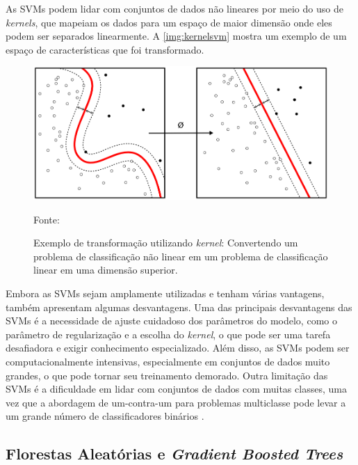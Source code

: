 As SVMs podem lidar com conjuntos de dados não lineares por meio do uso de \textit{kernels}, que mapeiam os dados para um espaço de maior dimensão onde eles podem ser separados linearmente. A \autoref{img:kernelsvm} mostra um exemplo de um espaço de características que foi transformado.

\begin{figure}[H]
	\centering
	\caption{\label{img:kernelsvm}Exemplo de transformação utilizando \textit{kernel}: Convertendo um problema de classificação não linear em um problema de classificação linear em uma dimensão superior.}
	\includegraphics[scale=0.5]{USPSC-img/Kernel_Machine.png}
	\begin{center}
		Fonte: \cite{wiki}
	\end{center}
\end{figure}

Embora as SVMs sejam amplamente utilizadas e tenham várias vantagens, também apresentam algumas desvantagens. Uma das principais desvantagens das SVMs é a necessidade de ajuste cuidadoso dos parâmetros do modelo, como o parâmetro de regularização e a escolha do \textit{kernel}, o que pode ser uma tarefa desafiadora e exigir conhecimento especializado. Além disso, as SVMs podem ser computacionalmente intensivas, especialmente em conjuntos de dados muito grandes, o que pode tornar seu treinamento demorado. Outra limitação das SVMs é a dificuldade em lidar com conjuntos de dados com muitas classes, uma vez que a abordagem de um-contra-um para problemas multiclasse pode levar a um grande número de classificadores binários \cite{trevorHastie}.

\subsection{Florestas Aleatórias e \textit{Gradient Boosted Trees}}

